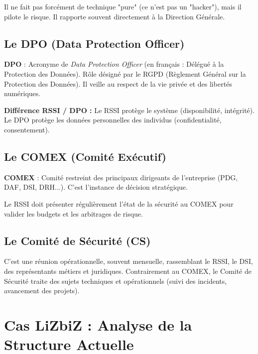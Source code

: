 Il ne fait pas forcément de technique "pure" (ce n'est pas un "hacker"), mais il pilote le risque. Il rapporte souvent directement à la Direction Générale.

\subsection{Le DPO (Data Protection Officer)}

\begin{boxdef}
\textbf{DPO} : Acronyme de \textit{Data Protection Officer} (en français : Délégué à la Protection des Données).
Rôle désigné par le RGPD (Règlement Général sur la Protection des Données). Il veille au respect de la vie privée et des libertés numériques.
\end{boxdef}

\textbf{Différence RSSI / DPO :} Le RSSI protège le système (disponibilité, intégrité). Le DPO protège les données personnelles des individus (confidentialité, consentement).

\subsection{Le COMEX (Comité Exécutif)}

\begin{boxdef}
\textbf{COMEX} : Comité restreint des principaux dirigeants de l'entreprise (PDG, DAF, DSI, DRH...). C'est l'instance de décision stratégique.
\end{boxdef}

Le RSSI doit présenter régulièrement l'état de la sécurité au COMEX pour valider les budgets et les arbitrages de risque.

\subsection{Le Comité de Sécurité (CS)}

C'est une réunion opérationnelle, souvent mensuelle, rassemblant le RSSI, le DSI, des représentants métiers et juridiques. Contrairement au COMEX, le Comité de Sécurité traite des sujets techniques et opérationnels (suivi des incidents, avancement des projets).

\section{Cas LiZbiZ : Analyse de la Structure Actuelle}

